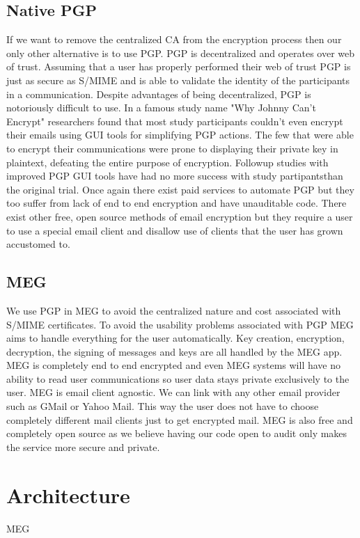 \documentclass[10pt,twocolumn]{article}
\begin{document}
\subsection{Native PGP}
\par If we want to remove the centralized CA from the encryption process then our only other alternative is to use PGP. PGP is decentralized and operates over web of trust. Assuming that a user has properly performed their web of trust PGP is just as secure as S/MIME and is able to validate the identity of the participants in a communication. Despite advantages of being decentralized, PGP is notoriously difficult to use. In a famous study name "Why Johnny Can't Encrypt" researchers found that most study participants couldn't even encrypt their emails using GUI tools for simplifying PGP actions. The few that were able to encrypt their communications were prone to displaying their private key in plaintext, defeating the entire purpose of encryption. Followup studies with improved PGP GUI tools have had no more success with study partipantsthan the original trial. Once again there exist paid services to automate PGP but they too suffer from lack of end to end encryption and have unauditable code. There exist other free, open source methods of email encryption but they require a user to use a special email client and disallow use of clients that the user has grown accustomed to.
\subsection{MEG}
\par We use PGP in MEG to avoid the centralized nature and cost associated with S/MIME certificates. To avoid the usability problems associated with PGP MEG aims to handle everything for the user automatically. Key creation, encryption, decryption, the signing of messages and keys are all handled by the MEG app. MEG is completely end to end encrypted and even MEG systems will have no ability to read user communications so user data stays private exclusively to the user. MEG is email client agnostic. We can link with any other email provider such as GMail or Yahoo Mail. This way the user does not have to choose completely different mail clients just to get encrypted mail. MEG is also free and completely open source as we believe having our code open to audit only makes the service more secure and private.

\section{Architecture}
\par MEG


\end{document}
